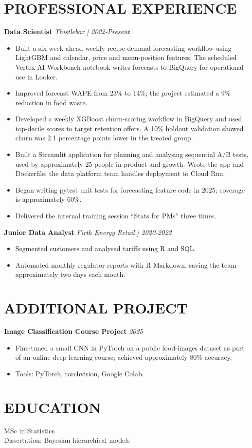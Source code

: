 \documentclass[11pt,a4paper]{article}
\begin{document}
\section*{PROFESSIONAL EXPERIENCE}
\textbf{Data Scientist} \hfill \textit{Thistlebox | 2022-Present}
\begin{itemize}
\item Built a six-week-ahead weekly recipe-demand forecasting workflow using LightGBM and calendar, price and menu-position features. The scheduled Vertex AI Workbench notebook writes forecasts to BigQuery for operational use in Looker.
\item Improved forecast WAPE from 23\% to 14\%; the project estimated a 9\% reduction in food waste.
\item Developed a weekly XGBoost churn-scoring workflow in BigQuery and used top-decile scores to target retention offers. A 10\% holdout validation showed churn was 2.1 percentage points lower in the treated group.
\item Built a Streamlit application for planning and analysing sequential A/B tests, used by approximately 25 people in product and growth. Wrote the app and Dockerfile; the data platform team handles deployment to Cloud Run.
\item Began writing pytest unit tests for forecasting feature code in 2025; coverage is approximately 60\%.
\item Delivered the internal training session “Stats for PMs” three times.
\end{itemize}
\textbf{Junior Data Analyst} \hfill \textit{Firth Energy Retail | 2020-2022}
\begin{itemize}
\item Segmented customers and analysed tariffs using R and SQL.
\item Automated monthly regulator reports with R Markdown, saving the team approximately two days each month.
\end{itemize}

\section*{ADDITIONAL PROJECT}
\textbf{Image Classification Course Project} \hfill \textit{2025}
\begin{itemize}
\item Fine-tuned a small CNN in PyTorch on a public food-images dataset as part of an online deep learning course; achieved approximately 80\% accuracy.
\item Tools: PyTorch, torchvision, Google Colab.
\end{itemize}

\section*{EDUCATION}
MSc in Statistics\\
Dissertation: Bayesian hierarchical models
\end{document}
